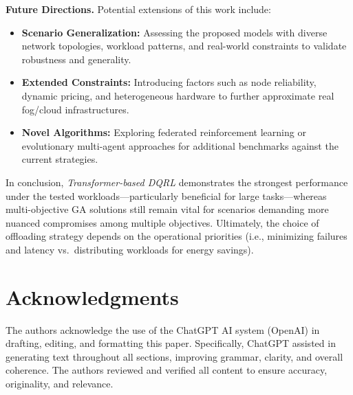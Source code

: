\documentclass[preprint,12pt]{elsarticle}
\begin{document}
\noindent\textbf{Future Directions.}
Potential extensions of this work include:
\begin{itemize}
    \item \textbf{Scenario Generalization:} Assessing the proposed models with diverse network topologies, workload patterns, and real-world constraints to validate robustness and generality.
    \item \textbf{Extended Constraints:} Introducing factors such as node reliability, dynamic pricing, and heterogeneous hardware to further approximate real fog/cloud infrastructures.
    \item \textbf{Novel Algorithms:} Exploring federated reinforcement learning or evolutionary multi-agent approaches for additional benchmarks against the current strategies.
\end{itemize}

\noindent
In conclusion, \emph{Transformer-based DQRL} demonstrates the strongest performance under the tested workloads—particularly beneficial for large tasks—whereas multi-objective GA solutions still remain vital for scenarios demanding more nuanced compromises among multiple objectives. Ultimately, the choice of offloading strategy depends on the operational priorities (i.e., minimizing failures and latency vs.\ distributing workloads for energy savings).

\section*{Acknowledgments}
The authors acknowledge the use of the ChatGPT AI system (OpenAI) in drafting, editing, and formatting this paper. Specifically, ChatGPT assisted in generating text throughout all sections, improving grammar, clarity, and overall coherence. The authors reviewed and verified all content to ensure accuracy, originality, and relevance.







\end{document}
